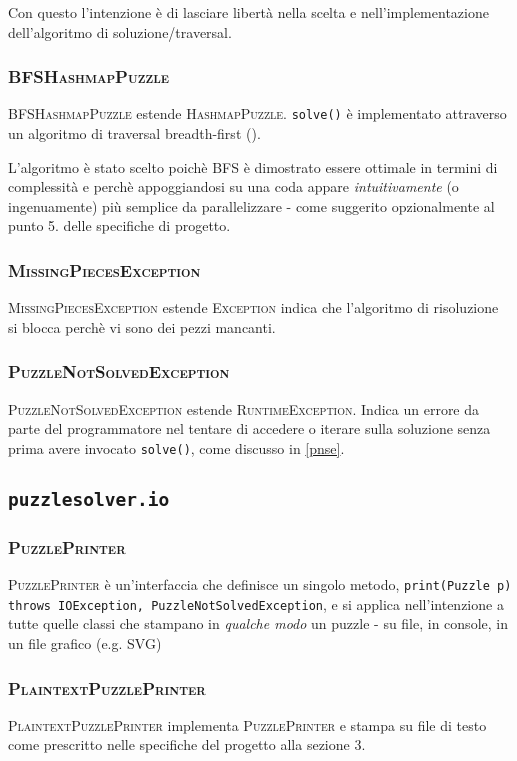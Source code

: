 \documentclass[a4paper]{article}
\newcommand{\Classname}[1]{\textsc{#1}}
\newcommand{\Methodname}[1]{\texttt{#1}}
\newcommand{\Pkgname}[1]{\texttt{#1}}
\begin{document}
Con questo l'intenzione \`e di lasciare libert\`a nella scelta e nell'implementazione dell'algoritmo di soluzione/traversal.

\subsubsection{\Classname{BFSHashmapPuzzle}}
\Classname{BFSHashmapPuzzle} estende \Classname{HashmapPuzzle}.
\Methodname{solve()} \`e implementato attraverso un algoritmo di traversal breadth-first (\cite{cormen2001introduction}).

L'algoritmo \`e stato scelto poich\`e BFS \`e dimostrato essere ottimale in termini di complessit\`a e perch\`e appoggiandosi su una coda appare \emph{intuitivamente} (o ingenuamente) pi\`u semplice da parallelizzare - come suggerito opzionalmente al punto 5. delle specifiche di progetto.

\subsubsection{\Classname{MissingPiecesException}}
\Classname{MissingPiecesException} estende \Classname{Exception} indica che l'algoritmo di risoluzione si blocca perch\`e vi sono dei pezzi mancanti.

\subsubsection{\Classname{PuzzleNotSolvedException}}
\Classname{PuzzleNotSolvedException} estende \Classname{RuntimeException}.
Indica un errore da parte del programmatore nel tentare di accedere o iterare sulla soluzione senza prima avere invocato \Methodname{solve()}, come discusso in \ref{pnse}.
\subsection{\Pkgname{puzzlesolver.io}}
\subsubsection{\Classname{PuzzlePrinter}}
\Classname{PuzzlePrinter} \`e un'interfaccia che definisce un singolo metodo, \Methodname{print(Puzzle p) throws IOException, PuzzleNotSolvedException}, e si applica nell'intenzione a tutte quelle classi che stampano in \emph{qualche modo} un puzzle - su file, in console, in un file grafico (e.g. SVG) 
\subsubsection{\Classname{PlaintextPuzzlePrinter}}
\Classname{PlaintextPuzzlePrinter} implementa \Classname{PuzzlePrinter} e stampa su file di testo come prescritto nelle specifiche del progetto alla sezione 3.
\end{document}
